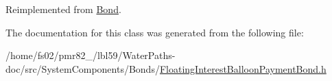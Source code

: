 Reimplemented from \mbox{\hyperlink{classBond_a726edbe3ea7047ebc7246585943763e3}{Bond}}.



The documentation for this class was generated from the following file\+:\begin{DoxyCompactItemize}
\item 
/home/fs02/pmr82\+\_/lbl59/\+Water\+Paths-\/doc/src/\+System\+Components/\+Bonds/\mbox{\hyperlink{FloatingInterestBalloonPaymentBond_8h}{Floating\+Interest\+Balloon\+Payment\+Bond.\+h}}\end{DoxyCompactItemize}
